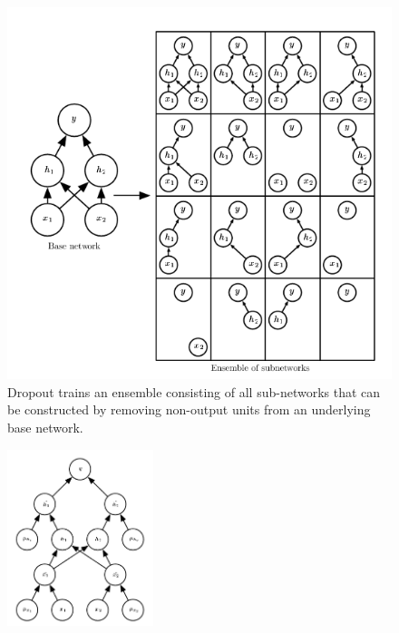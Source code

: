 \newpage
\begin{figure}
	\includegraphics[width=\linewidth]{figures/dropout}
	\caption{Dropout trains an ensemble consisting of all sub-networks that can be
		constructed by removing non-output units from an underlying base network.}
	\label{fig:dropout}
\end{figure}

\begin{figure}
	\vspace{-20pt}
	\begin{center}
		\includegraphics[width=0.38\textwidth]{figures/dropoutexample}\label{dropoutexample}
	\end{center}
	\vspace{-20pt}
	\vspace{-10pt}
\end{figure}

